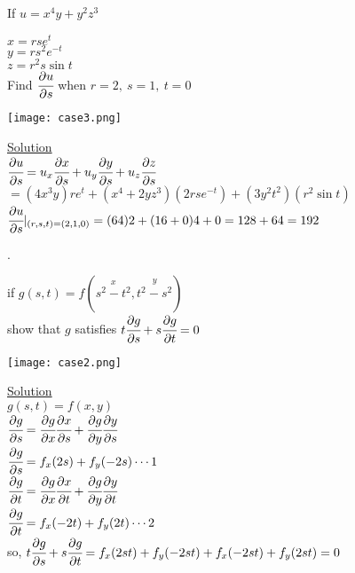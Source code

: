\noindent{\color{smalt(darkpowderblue)}\rule{\linewidth}{.2mm}}
\begin{example}
If $u=x^4 y+y^2 z^3$\\
\noindent\begin{minipage}{0.5\textwidth}
$x=r s e^t$\\
$y=rs^2 e^{-t}$\\
$z=r^2 s \sin{t}$\\
Find $\cfrac{\partial u}{\partial s}$ when $r=2,~s=1,~t=0$\\
\end{minipage}
\noindent\begin{minipage}{0.5\textwidth}
\begin{center}
   \texttt{[image: case3.png]}\\
\end{center}\end{minipage}
\underline{\textbf{\large}\color{smalt(darkpowderblue)}Solution}\\
$\cfrac{\partial u}{\partial s}=u_x\cfrac{\partial x}{\partial s}+u_y\cfrac{\partial y}{\partial s}+u_z\cfrac{\partial z}{\partial s}$\\
$=(4x^3 y)r e^t+(x^4+2y z^3)(2r s e^{-t})+(3y^2t^2)(r^2\sin{t})$\\
$\cfrac{\partial u}{\partial s}|_{(r,s,t)=(2,1,0)}=(64)2+(16+0)4+0=128+64=192$
\end{example}
\noindent{\color{smalt(darkpowderblue)}\rule{\linewidth}{.2mm}}
\begin{example}.\\
\noindent\begin{minipage}{0.5\textwidth}
if $g(s,t)=f(\overset{x}{s^2-t^2},\overset{y}{t^2-s^2})$\\
show that $g$ satisfies $t\cfrac{\partial g}{\partial s}+s\cfrac{\partial g}{\partial t}=0$\\
\end{minipage}
\noindent\begin{minipage}{0.5\textwidth}
\begin{center}
   \texttt{[image: case2.png]}\\
\end{center}\end{minipage}
\underline{\textbf{\large}\color{smalt(darkpowderblue)}Solution}\\
$g(s,t)=f(x,y)$\\
$\cfrac{\partial g}{\partial s}=\cfrac{\partial g}{\partial x}\cfrac{\partial x}{\partial s}+\cfrac{\partial g}{\partial y}\cfrac{\partial y}{\partial s}$\\
$\cfrac{\partial g}{\partial s}=f_x(2s)+f_y(-2s)\cdots 1$\\
$\cfrac{\partial g}{\partial t}=\cfrac{\partial g}{\partial x}\cfrac{\partial x}{\partial t}+\cfrac{\partial g}{\partial y}\cfrac{\partial y}{\partial t}$\\
$\cfrac{\partial g}{\partial t}=f_x(-2t)+f_y(2t)\cdots 2$\\
so, $t\cfrac{\partial g}{\partial s}+s\cfrac{\partial g}{\partial t}=f_x(2st)+f_y(-2st)+f_x(-2st)+f_y(2st)=0$\\
\end{example}
